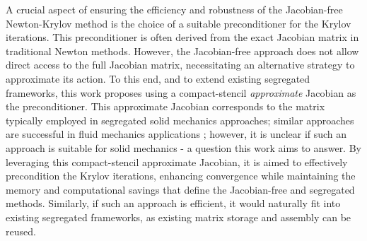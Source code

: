 \documentclass[sn-mathphys,Numbered]{sn-jnl}%
\begin{document}
A crucial aspect of ensuring the efficiency and robustness of the Jacobian-free Newton-Krylov method is the choice of a suitable preconditioner for the Krylov iterations.
This preconditioner is often derived from the exact Jacobian matrix in traditional Newton methods.
However, the Jacobian-free approach does not allow direct access to the full Jacobian matrix, necessitating an alternative strategy to approximate its action.
To this end, and to extend existing segregated frameworks, this work proposes using a compact-stencil \emph{approximate} Jacobian as the preconditioner. This approximate Jacobian corresponds to the matrix typically employed in segregated solid mechanics approaches; similar approaches are successful in fluid mechanics applications \citep{Mchugh1994, Qin2000, Geuzaine2001, Pernice2001, Knoll2004, Nejat2008, Vaassen2008, Lucas2010, Nejat2011, Nishikawa2020}; however, it is unclear if such an approach is suitable for solid mechanics - a question this work aims to answer.
By leveraging this compact-stencil approximate Jacobian, it is aimed to effectively precondition the Krylov iterations, enhancing convergence while maintaining the memory and computational savings that define the Jacobian-free and segregated methods.
Similarly, if such an approach is efficient, it would naturally fit into existing segregated frameworks, as existing matrix storage and assembly can be reused.

\end{document}
